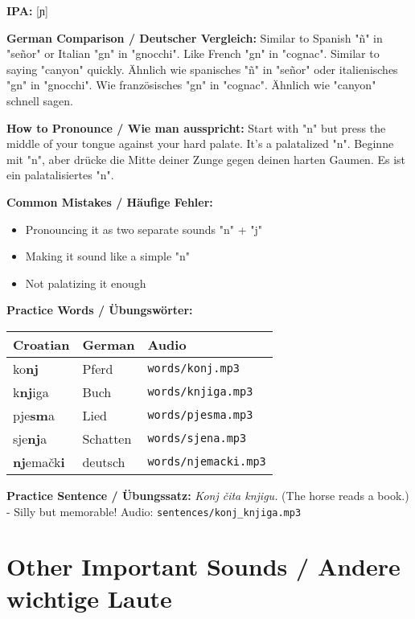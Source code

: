 \begin{tcolorbox}[colback=lightgreen!30, colframe=green!60!black, title=\textbf{Nj, nj}]

\textbf{IPA:} [ɲ]

\textbf{German Comparison / Deutscher Vergleich:}
Similar to Spanish "ñ" in "señor" or Italian "gn" in "gnocchi". Like French "gn" in "cognac". Similar to saying "canyon" quickly.
Ähnlich wie spanisches "ñ" in "señor" oder italienisches "gn" in "gnocchi". Wie französisches "gn" in "cognac". Ähnlich wie "canyon" schnell sagen.

\textbf{How to Pronounce / Wie man ausspricht:}
Start with "n" but press the middle of your tongue against your hard palate. It's a palatalized "n".
Beginne mit "n", aber drücke die Mitte deiner Zunge gegen deinen harten Gaumen. Es ist ein palatalisiertes "n".

\textbf{Common Mistakes / Häufige Fehler:}
\begin{itemize}
    \item Pronouncing it as two separate sounds "n" + "j"
    \item Making it sound like a simple "n"
    \item Not palatizing it enough
\end{itemize}

\textbf{Practice Words / Übungswörter:}
\begin{tabular}{lll}
\textbf{Croatian} & \textbf{German} & \textbf{Audio} \\
\midrule
ko\textbf{nj} & Pferd & \texttt{words/konj.mp3} \\
k\textbf{nj}iga & Buch & \texttt{words/knjiga.mp3} \\
pje\textbf{sm}a & Lied & \texttt{words/pjesma.mp3} \\
sje\textbf{nj}a & Schatten & \texttt{words/sjena.mp3} \\
\textbf{nj}emačk\textbf{i} & deutsch & \texttt{words/njemacki.mp3} \\
\end{tabular}

\textbf{Practice Sentence / Übungssatz:}
\textit{Konj čita knjigu.}
(The horse reads a book.) - Silly but memorable!
Audio: \texttt{sentences/konj\_knjiga.mp3}

\end{tcolorbox}

\section{Other Important Sounds / Andere wichtige Laute}

